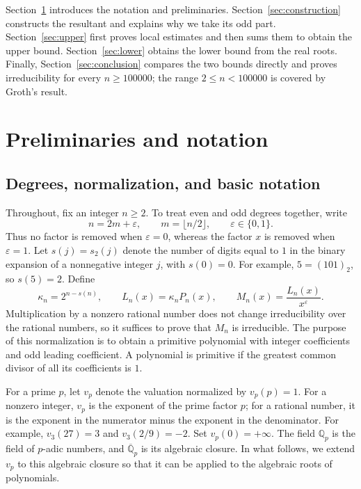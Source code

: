 \documentclass[11pt,a4paper]{article}
\numberwithin{equation}{section}
\theoremstyle{definition}
\begin{document}
Section~\ref{sec:prelim} introduces the notation and preliminaries. Section~\ref{sec:construction} constructs the resultant and explains why we take its odd part. Section~\ref{sec:upper} first proves local estimates and then sums them to obtain the upper bound. Section~\ref{sec:lower} obtains the lower bound from the real roots. Finally, Section~\ref{sec:conclusion} compares the two bounds directly and proves irreducibility for every \(n\ge100000\); the range \(2\le n<100000\) is covered by Groth's result.

\section{Preliminaries and notation}\label{sec:prelim}

\subsection{Degrees, normalization, and basic notation}

Throughout, fix an integer \(n\ge2\). To treat even and odd degrees together, write
\[
n=2m+\varepsilon,\qquad m=\lfloor n/2\rfloor,\qquad\varepsilon\in\{0,1\}.
\]
Thus no factor is removed when \(\varepsilon=0\), whereas the factor \(x\) is removed when \(\varepsilon=1\). Let \(s(j)=s_2(j)\) denote the number of digits equal to \(1\) in the binary expansion of a nonnegative integer \(j\), with \(s(0)=0\). For example, \(5=(101)_2\), so \(s(5)=2\). Define
\begin{equation}
\kappa_n=2^{n-s(n)},\qquad L_n(x)=\kappa_n P_n(x),\qquad
M_n(x)=\frac{L_n(x)}{x^\varepsilon}.
\label{eq:old1.1}
\end{equation}
Multiplication by a nonzero rational number does not change irreducibility over the rational numbers, so it suffices to prove that \(M_n\) is irreducible. The purpose of this normalization is to obtain a primitive polynomial with integer coefficients and odd leading coefficient. A polynomial is primitive if the greatest common divisor of all its coefficients is \(1\).

For a prime \(p\), let \(v_p\) denote the valuation normalized by \(v_p(p)=1\). For a nonzero integer, \(v_p\) is the exponent of the prime factor \(p\); for a rational number, it is the exponent in the numerator minus the exponent in the denominator. For example, \(v_3(27)=3\) and \(v_3(2/9)=-2\). Set \(v_p(0)=+\infty\). The field \(\mathbb Q_p\) is the field of \(p\)-adic numbers, and \(\overline{\mathbb Q}_p\) is its algebraic closure. In what follows, we extend \(v_p\) to this algebraic closure so that it can be applied to the algebraic roots of polynomials.
\end{document}
